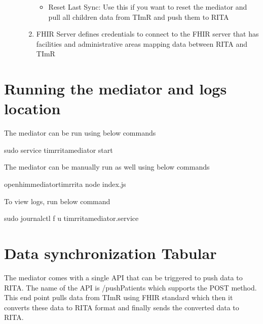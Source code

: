 \documentclass[letterpaper,10pt,english]{sphinxmanual}
\begin{document}
\begin{description}
\begin{enumerate}
\begin{itemize}
\item {} 
\sphinxAtStartPar
Reset Last Sync: Use this if you want to reset the mediator and pull all children data from TImR and push them to RITA

\end{itemize}

\item {} 
\sphinxAtStartPar
FHIR Server defines credentials to connect to the FHIR server that has facilities and administrative areas mapping data between RITA and TImR

\end{enumerate}

\end{description}


\chapter{Running the mediator and logs location}
\label{\detokenize{running:running-the-mediator-and-logs-location}}\label{\detokenize{running::doc}}
\sphinxAtStartPar
The mediator can be run using below commands

\begin{sphinxVerbatim}[commandchars=\\\{\}]
sudo service timr\PYGZhy{}rita\PYGZhy{}mediator start
\end{sphinxVerbatim}

\sphinxAtStartPar
The mediator can be manually run as well using below commands

\begin{sphinxVerbatim}[commandchars=\\\{\}]
 openhim\PYGZhy{}mediator\PYGZhy{}timr\PYGZhy{}rita
node index.js
\end{sphinxVerbatim}

\sphinxAtStartPar
To view logs, run below command

\begin{sphinxVerbatim}[commandchars=\\\{\}]
sudo journalctl \PYGZhy{}f \PYGZhy{}u timr\PYGZhy{}rita\PYGZhy{}mediator.service
\end{sphinxVerbatim}


\chapter{Data synchronization \sphinxhyphen{} Tabular}
\label{\detokenize{sync:data-synchronization-tabular}}\label{\detokenize{sync::doc}}
\sphinxAtStartPar
The mediator comes with a single API that can be triggered to push data to RITA. The name of the API is /pushPatients which supports the POST method. This end point pulls data from TImR using FHIR standard which then it converts these data to RITA format and finally sends the converted data to RITA.
\end{document}
